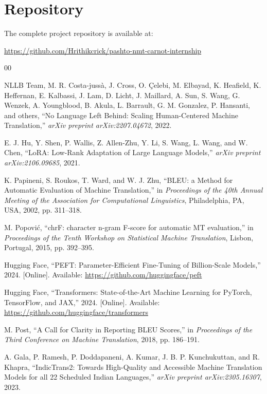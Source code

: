 \documentclass[conference]{IEEEtran}
\begin{document}
\section*{Repository}

The complete project repository is available at:

\begin{center}
\url{https://github.com/Hrithikcrick/pashto-nmt-carnot-internship}
\end{center}

\begin{thebibliography}{00}

NLLB Team, M. R. Costa-jussà, J. Cross, O. Çelebi, M. Elbayad, K. Heafield, K. Heffernan, E. Kalbassi, J. Lam, D. Licht, J. Maillard, A. Sun, S. Wang, G. Wenzek, A. Youngblood, B. Akula, L. Barrault, G. M. Gonzalez, P. Hansanti, and others, ``No Language Left Behind: Scaling Human-Centered Machine Translation,'' \textit{arXiv preprint arXiv:2207.04672}, 2022.

E. J. Hu, Y. Shen, P. Wallis, Z. Allen-Zhu, Y. Li, S. Wang, L. Wang, and W. Chen, ``LoRA: Low-Rank Adaptation of Large Language Models,'' \textit{arXiv preprint arXiv:2106.09685}, 2021.

K. Papineni, S. Roukos, T. Ward, and W. J. Zhu, ``BLEU: a Method for Automatic Evaluation of Machine Translation,'' in \textit{Proceedings of the 40th Annual Meeting of the Association for Computational Linguistics}, Philadelphia, PA, USA, 2002, pp. 311--318.

M. Popovi\'c, ``chrF: character n-gram F-score for automatic MT evaluation,'' in \textit{Proceedings of the Tenth Workshop on Statistical Machine Translation}, Lisbon, Portugal, 2015, pp. 392--395.

Hugging Face, ``PEFT: Parameter-Efficient Fine-Tuning of Billion-Scale Models,'' 2024. [Online]. Available: \url{https://github.com/huggingface/peft}

Hugging Face, ``Transformers: State-of-the-Art Machine Learning for PyTorch, TensorFlow, and JAX,'' 2024. [Online]. Available: \url{https://github.com/huggingface/transformers}

M. Post, ``A Call for Clarity in Reporting BLEU Scores,'' in \textit{Proceedings of the Third Conference on Machine Translation}, 2018, pp. 186--191.

A. Gala, P. Ramesh, P. Doddapaneni, A. Kumar, J. B. P. Kunchukuttan, and R. Khapra, ``IndicTrans2: Towards High-Quality and Accessible Machine Translation Models for all 22 Scheduled Indian Languages,'' \textit{arXiv preprint arXiv:2305.16307}, 2023.


\end{thebibliography}
\end{document}
